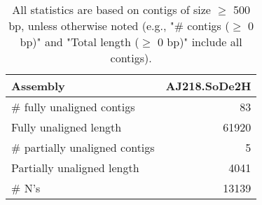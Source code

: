 \documentclass[12pt,a4paper]{article}
\begin{document}
\begin{table}[ht]
\begin{center}
\caption{All statistics are based on contigs of size $\geq$ 500 bp, unless otherwise noted (e.g., "\# contigs ($\geq$ 0 bp)" and "Total length ($\geq$ 0 bp)" include all contigs).}
\begin{tabular}{|l*{1}{|r}|}
\hline
Assembly & AJ218.SoDe2H \\ \hline
\# fully unaligned contigs & 83 \\ \hline
Fully unaligned length & 61920 \\ \hline
\# partially unaligned contigs & 5 \\ \hline
Partially unaligned length & 4041 \\ \hline
\# N's & 13139 \\ \hline
\end{tabular}
\end{center}
\end{table}
\end{document}
